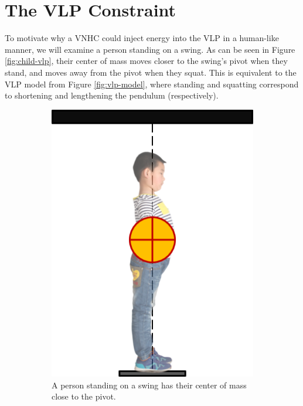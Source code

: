 \section{The VLP Constraint}
To motivate why a VNHC could inject energy into the VLP in a human-like
manner, we will examine a person standing on a swing.
As can be seen in Figure \ref{fig:child-vlp}, their center of mass moves closer
to the swing's pivot when they stand, and moves away from the pivot when they
squat.
This is equivalent to the VLP model from Figure \ref{fig:vlp-model}, where
standing and squatting correspond to shortening and lengthening the pendulum
(respectively).
\begin{figure}
   \centering
   \begin{subfigure}[t]{0.45\textwidth}
      \includegraphics[]{images/child_vlp_standing.png}
      \caption{A person standing on a swing has their center of mass 
      close to the pivot.}
   \end{subfigure}
   \hfill
   \begin{subfigure}[t]{0.45\textwidth}

\end{subfigure}
\end{figure}
